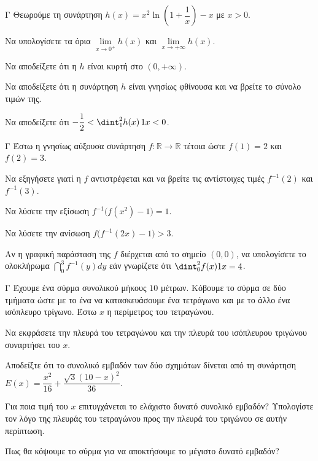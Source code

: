 \begin{thema}{Γ}
Θεωρούμε τη συνάρτηση $h(x) = x^2 \ln\left(1 + \dfrac{1}{x}\right) - x$ με $x > 0$.
\begin{erwthma}
  \item Να υπολογίσετε τα όρια $\lim\limits_{x \to 0^+} h(x)$ και $\lim\limits_{x \to +\infty} h(x)$.
  \item Να αποδείξετε ότι η $h$ είναι κυρτή στο $(0, +\infty)$.
  \item Να αποδείξετε ότι η συνάρτηση $h$ είναι γνησίως φθίνουσα και να βρείτε το σύνολο τιμών της.
  \item Να αποδείξετε ότι $-\dfrac{1}{2} < \dint_1^2 h(x) \, \d x < 0$.
\end{erwthma}
\end{thema}

\begin{thema}{Γ}
Έστω η γνησίως αύξουσα συνάρτηση $f: \mathbb{R} \to \mathbb{R}$ τέτοια ώστε $f(1) = 2$ και $f(2) = 3$. 
\begin{erwthma}
  \item Να εξηγήσετε γιατί η $f$ αντιστρέφεται και να βρείτε τις αντίστοιχες τιμές $f^{-1}(2)$ και $f^{-1}(3)$.
  \item Να λύσετε την εξίσωση $f^{-1}\big(f(x^2)-1\big) = 1$.
  \item Να λύσετε την ανίσωση $f\big(f^{-1}(2x) - 1\big) > 3$.
  \item Αν η γραφική παράσταση της $f$ διέρχεται από το σημείο $(0,0)$, να υπολογίσετε το ολοκλήρωμα $\dint_0^3 f^{-1}(y)dy$ εάν γνωρίζετε ότι $\dint_0^2 f(x)\d x = 4$.
\end{erwthma}
\end{thema}

\begin{thema}{Γ}
Έχουμε ένα σύρμα συνολικού μήκους $10$ μέτρων. Κόβουμε το σύρμα σε δύο τμήματα ώστε με το ένα να κατασκευάσουμε ένα τετράγωνο και με το άλλο ένα ισόπλευρο τρίγωνο. Έστω $x$ η περίμετρος του τετραγώνου.
\begin{erwthma}
  \item Να εκφράσετε την πλευρά του τετραγώνου και την πλευρά του ισόπλευρου τριγώνου συναρτήσει του $x$.
  \item Αποδείξτε ότι το συνολικό εμβαδόν των δύο σχημάτων δίνεται από τη συνάρτηση $E(x) = \dfrac{x^2}{16} + \dfrac{\sqrt{3}(10-x)^2}{36}$.
  \item Για ποια τιμή του $x$ επιτυγχάνεται το ελάχιστο δυνατό συνολικό εμβαδόν? Υπολογίστε τον λόγο της πλευράς του τετραγώνου προς την πλευρά του τριγώνου σε αυτήν περίπτωση.
  \item Πως θα κόψουμε το σύρμα για να αποκτήσουμε το μέγιστο δυνατό εμβαδόν?
\end{erwthma}
\end{thema}

